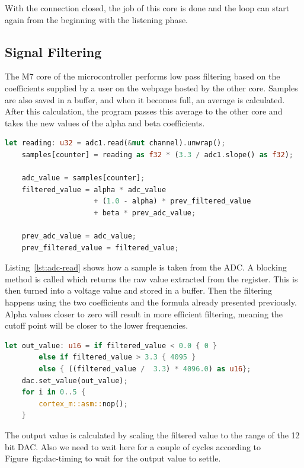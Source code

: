 With the connection closed, the job of this core is done and the loop can start again from the beginning with the listening phase.

\subsection{Signal Filtering}

The M7 core of the microcontroller performs low pass filtering based on the coefficients supplied by a user on the webpage hosted by the other core. Samples are also saved in a buffer, and when it becomes full, an average is calculated. After this calculation, the program passes this average to the other core and takes the new values of the alpha and beta coefficients.

\begin{lstlisting}[language=Rust,frame=single,float=!ht,style=customrust,label={lst:adc-read},caption={Reading and Converting Input Voltage}]
    let reading: u32 = adc1.read(&mut channel).unwrap();
    samples[counter] = reading as f32 * (3.3 / adc1.slope() as f32);

    adc_value = samples[counter];
    filtered_value = alpha * adc_value
                     + (1.0 - alpha) * prev_filtered_value
                     + beta * prev_adc_value;

    prev_adc_value = adc_value;
    prev_filtered_value = filtered_value;
\end{lstlisting}

Listing~\ref{lst:adc-read} shows how a sample is taken from the ADC. A blocking  method is called which returns the raw value extracted from the register. This is then turned into a voltage value and stored in a buffer. Then the filtering happens using the two coefficients and the formula already presented previously. Alpha values closer to zero will result in more efficient filtering, meaning the cutoff point will be closer to the lower frequencies.

\begin{lstlisting}[language=Rust,frame=single,float=!ht,style=customrust,label={lst:dac-set},caption={Setting the DAC Output Value}]
    let out_value: u16 = if filtered_value < 0.0 { 0 }
        else if filtered_value > 3.3 { 4095 }
        else { ((filtered_value /  3.3) * 4096.0) as u16};
    dac.set_value(out_value);
    for i in 0..5 {
        cortex_m::asm::nop();
    }
\end{lstlisting}

The output value is calculated by scaling the filtered value to the range of the 12 bit DAC. Also we need to wait here for a couple of cycles according to Figure~{fig:dac-timing} to wait for the output value to settle.

